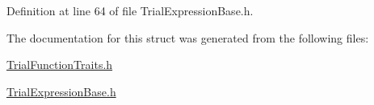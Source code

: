 Definition at line 64 of file Trial\+Expression\+Base.\+h.



The documentation for this struct was generated from the following files\+:\begin{DoxyCompactItemize}
\item 
\hyperlink{_trial_function_traits_8h}{Trial\+Function\+Traits.\+h}\item 
\hyperlink{_trial_expression_base_8h}{Trial\+Expression\+Base.\+h}\end{DoxyCompactItemize}
